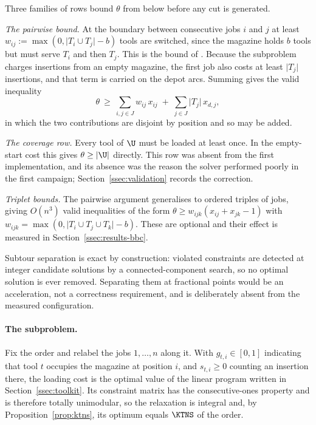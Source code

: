 Three families of rows bound $\theta$ from below before any cut is generated.

\emph{The pairwise bound.} At the boundary between consecutive jobs $i$ and $j$ at
least $w_{ij}:=\max(0,\lvert T_i\cup T_j\rvert-b)$ tools are switched, since the
magazine holds $b$ tools but must serve $T_i$ and then $T_j$. This is the bound of
\citet{Tang1988}. Because the subproblem charges insertions from an empty magazine,
the first job also costs at least $\lvert T_{j}\rvert$ insertions, and that term is
carried on the depot arcs. Summing gives the valid inequality
\[
  \theta\ \ge\ \sum_{i,j\in J} w_{ij}\,x_{ij}\;+\;\sum_{j\in J}\lvert T_j\rvert\,x_{d,j},
\]
in which the two contributions are disjoint by position and so may be added.

\emph{The coverage row.} Every tool of $\U$ must be loaded at least once. In the
empty-start cost this gives $\theta\ge\lvert\U\rvert$ directly. This row was absent
from the first implementation, and its absence was the reason the solver performed
poorly in the first campaign; Section~\ref{ssec:validation} records the correction.

\emph{Triplet bounds.} The pairwise argument generalises to ordered triples of jobs,
giving $O(n^{3})$ valid inequalities of the form
$\theta\ge w_{ijk}(x_{ij}+x_{jk}-1)$ with
$w_{ijk}=\max(0,\lvert T_i\cup T_j\cup T_k\rvert-b)$. These are optional and their
effect is measured in Section~\ref{ssec:results-bbc}.

Subtour separation is exact by construction: violated constraints are detected at
integer candidate solutions by a connected-component search, so no optimal solution is
ever removed. Separating them at fractional points would be an acceleration, not a
correctness requirement, and is deliberately absent from the measured configuration.

\paragraph{The subproblem.}
Fix the order and relabel the jobs $1,\dots,n$ along it. With $g_{t,i}\in[0,1]$
indicating that tool $t$ occupies the magazine at position $i$, and $s_{t,i}\ge0$
counting an insertion there, the loading cost is the optimal value of the linear
program written in Section~\ref{ssec:toolkit}. Its constraint matrix has the
consecutive-ones property and is therefore totally unimodular, so the relaxation is
integral and, by Proposition~\ref{prop:ktns}, its optimum equals $\KTNS$ of the order.

